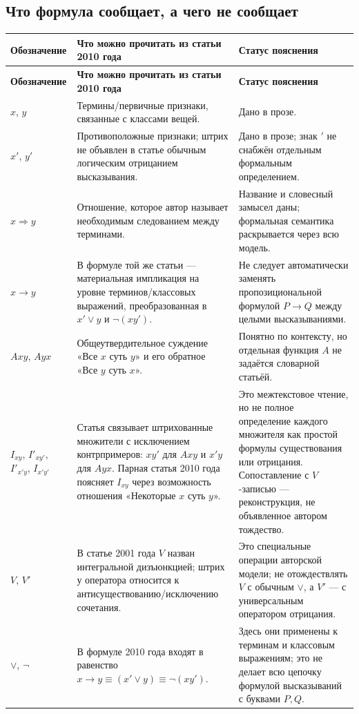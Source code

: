 \documentclass[12pt,a4paper]{article}
\begin{document}
\subsection{Что формула сообщает, а чего не сообщает}

\begin{longtable}{P{0.17\textwidth}P{0.38\textwidth}P{0.35\textwidth}}
\toprule
\textbf{Обозначение} & \textbf{Что можно прочитать из статьи 2010 года} & \textbf{Статус пояснения} \\
\midrule
\endfirsthead
\toprule
\textbf{Обозначение} & \textbf{Что можно прочитать из статьи 2010 года} & \textbf{Статус пояснения} \\
\midrule
\endhead
$x$, $y$ & Термины/первичные признаки, связанные с классами вещей. & Дано в прозе. \\
$x'$, $y'$ & Противоположные признаки; штрих не объявлен в статье обычным логическим отрицанием высказывания. & Дано в прозе; знак $'$ не снабжён отдельным формальным определением. \\
$x\Rightarrow y$ & Отношение, которое автор называет необходимым следованием между терминами. & Название и словесный замысел даны; формальная семантика раскрывается через всю модель. \\
$x\to y$ & В формуле той же статьи — материальная импликация на уровне терминов/классовых выражений, преобразованная в $x'\lor y$ и $\neg(xy')$. & Не следует автоматически заменять пропозициональной формулой $P\to Q$ между целыми высказываниями. \\
$Axy$, $Ayx$ & Общеутвердительное суждение «Все $x$ суть $y$» и его обратное «Все $y$ суть $x$». & Понятно по контексту, но отдельная функция $A$ не задаётся словарной статьёй. \\
$I_{xy}$, $I'_{xy'}$, $I'_{x'y}$, $I_{x'y'}$ & Статья связывает штрихованные множители с исключением контрпримеров: $xy'$ для $Axy$ и $x'y$ для $Ayx$. Парная статья 2010 года поясняет $I_{xy}$ через возможность отношения «Некоторые $x$ суть $y$». & Это межтекстовое чтение, но не полное определение каждого множителя как простой формулы существования или отрицания. Сопоставление с $V$-записью — реконструкция, не объявленное автором тождество. \\
$V$, $V'$ & В статье 2001 года $V$ назван интегральной дизъюнкцией; штрих у оператора относится к антисуществованию/исключению сочетания. & Это специальные операции авторской модели; не отождествлять $V$ с обычным $\lor$, а $V'$ — с универсальным оператором отрицания. \\
$\lor$, $\neg$ & В формуле 2010 года входят в равенство $x\to y\equiv(x'\lor y)\equiv\neg(xy')$. & Здесь они применены к терминам и классовым выражениям; это не делает всю цепочку формулой высказываний с буквами $P,Q$. \\

\end{longtable}
\end{document}
